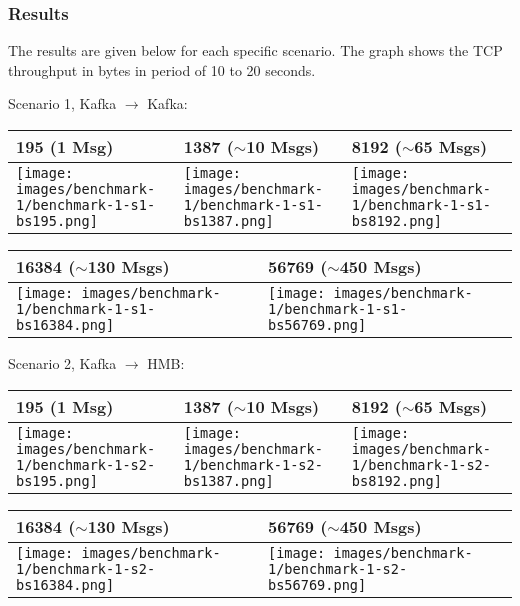 \subsubsection{Results}
The results are given below for each specific scenario. The graph shows the
TCP throughput in bytes in period of 10 to 20 seconds.

Scenario 1, Kafka $\rightarrow$ Kafka:

\begin{table}[H]
\centering
\begin{tabular}{|l|l|l|} \hline
195 (1 Msg) & 1387 ($\sim$10 Msgs)& 8192 ($\sim$65 Msgs)\\ \hline
\texttt{[image: images/benchmark-1/benchmark-1-s1-bs195.png]}
&
\texttt{[image: images/benchmark-1/benchmark-1-s1-bs1387.png]}
&
\texttt{[image: images/benchmark-1/benchmark-1-s1-bs8192.png]} \\ \hline
\end{tabular}
\end{table}

\begin{table}[H]
\centering
\begin{tabular}{|l|l|} \hline
16384 ($\sim$130 Msgs)& 56769 ($\sim$450 Msgs)\\ \hline
\texttt{[image: images/benchmark-1/benchmark-1-s1-bs16384.png]}
&
\texttt{[image: images/benchmark-1/benchmark-1-s1-bs56769.png]} \\ \hline
\end{tabular}
\end{table}

Scenario 2, Kafka $\rightarrow$ HMB:

\begin{table}[H]
\centering
\begin{tabular}{|l|l|l|} \hline
195 (1 Msg) & 1387 ($\sim$10 Msgs)& 8192 ($\sim$65 Msgs)\\ \hline
\texttt{[image: images/benchmark-1/benchmark-1-s2-bs195.png]}
&
\texttt{[image: images/benchmark-1/benchmark-1-s2-bs1387.png]}
&
\texttt{[image: images/benchmark-1/benchmark-1-s2-bs8192.png]} \\ \hline
\end{tabular}
\end{table}

\begin{table}[H]
\centering
\begin{tabular}{|l|l|} \hline
16384 ($\sim$130 Msgs)& 56769 ($\sim$450 Msgs)\\ \hline
\texttt{[image: images/benchmark-1/benchmark-1-s2-bs16384.png]}
&
\texttt{[image: images/benchmark-1/benchmark-1-s2-bs56769.png]} \\ \hline
\end{tabular}
\end{table}

